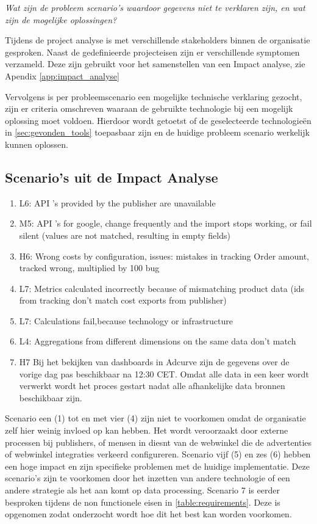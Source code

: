 \textit{Wat zijn de probleem scenario's waardoor gegevens niet te verklaren zijn, en wat zijn de mogelijke oplossingen?}

Tijdens de project analyse is met verschillende stakeholders binnen de organisatie gesproken. Naast de gedefinieerde projecteisen zijn er verschillende symptomen verzameld. Deze zijn gebruikt voor het samenstellen van een Impact analyse, zie Apendix \ref{app:impact_analyse}

Vervolgens is per probleemscenario een mogelijke technische verklaring gezocht, zijn er criteria omschreven waaraan de gebruikte technologie bij een mogelijk oplossing moet voldoen. Hierdoor wordt getoetst of de geselecteerde technologieën in \ref{sec:gevonden_tools} toepasbaar zijn en de huidige probleem scenario werkelijk kunnen oplossen.

\subsection{Scenario's uit de Impact Analyse}

\begin{enumerate}
    \item L6: API 's provided by the publisher are unavailable
    \item M5: API 's for google, change frequently and the import stops working, or fail silent (values are not matched, resulting in empty fields)
    \item H6: Wrong costs by configuration, issues: mistakes in tracking Order amount, tracked wrong, multiplied by 100 bug
    \item L7: Metrics calculated incorrectly because of mismatching product data (ids from tracking don't match cost exports from publisher)
    \item L7: Calculations fail,because technology or infrastructure 
    \item L4: Aggregations from different dimensions on the same data
    don't match
    \item H7 Bij het bekijken van dashboards in Adcurve zijn de gegevens over de vorige dag pas beschikbaar na 12:30 CET. Omdat alle data in een keer wordt verwerkt wordt het proces gestart nadat alle afhankelijke data bronnen beschikbaar zijn.
\end{enumerate}

Scenario een (1) tot en met vier (4) zijn niet te voorkomen omdat de organisatie zelf hier weinig invloed op kan hebben. Het wordt veroorzaakt door externe processen bij publishers, of mensen in diesnt van de webwinkel die de advertenties of webwinkel integraties verkeerd configureren. Scenario vijf (5) en zes (6) hebben een hoge impact en zijn specifieke problemen met de huidige implementatie. Deze scenario's zijn te voorkomen door het inzetten van andere technologie of een andere strategie als het aan komt op data processing.
Scenario 7 is eerder besproken tijdens de non functionele eisen in \ref{table:requirements}. Deze is opgenomen zodat onderzocht wordt hoe dit het best kan worden voorkomen.  

